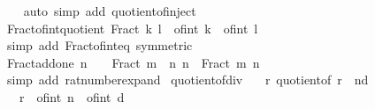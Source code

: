 \begin{isabellebody}
%
\isadelimproof
\ \ %
\endisadelimproof
%
\isatagproof
{}\isamarkupfalse%
\ {\isacharparenleft}{\kern0pt}auto\ simp\ add{\isacharcolon}{\kern0pt}\ quotient{\isacharunderscore}{\kern0pt}of{\isacharunderscore}{\kern0pt}inject{\isacharparenright}{\kern0pt}%
\endisatagproof
{\isafoldproof}%
%
\isadelimproof
%
\endisadelimproof
%
\isadelimdocument
%
\endisadelimdocument
%
\isatagdocument
%
\isamarkuptrue%
%
\endisatagdocument
{\isafolddocument}%
%
\isadelimdocument
%
\endisadelimdocument
{}\isamarkupfalse%
\ Fract{\isacharunderscore}{\kern0pt}of{\isacharunderscore}{\kern0pt}int{\isacharunderscore}{\kern0pt}quotient{\isacharcolon}{\kern0pt}\ {\isachardoublequoteopen}Fract\ k\ l\ {\isacharequal}{\kern0pt}\ of{\isacharunderscore}{\kern0pt}int\ k\ {\isacharslash}{\kern0pt}\ of{\isacharunderscore}{\kern0pt}int\ l{\isachardoublequoteclose}\isanewline
%
\isadelimproof
\ \ %
\endisadelimproof
%
\isatagproof
{}\isamarkupfalse%
\ {\isacharparenleft}{\kern0pt}simp\ add{\isacharcolon}{\kern0pt}\ Fract{\isacharunderscore}{\kern0pt}of{\isacharunderscore}{\kern0pt}int{\isacharunderscore}{\kern0pt}eq\ {\isacharbrackleft}{\kern0pt}symmetric{\isacharbrackright}{\kern0pt}{\isacharparenright}{\kern0pt}%
\endisatagproof
{\isafoldproof}%
%
\isadelimproof
\isanewline
%
\endisadelimproof
\isanewline
{}\isamarkupfalse%
\ Fract{\isacharunderscore}{\kern0pt}add{\isacharunderscore}{\kern0pt}one{\isacharcolon}{\kern0pt}\ {\isachardoublequoteopen}n\ {\isasymnoteq}\ {}\ {\isasymLongrightarrow}\ Fract\ {\isacharparenleft}{\kern0pt}m\ {\isacharplus}{\kern0pt}\ n{\isacharparenright}{\kern0pt}\ n\ {\isacharequal}{\kern0pt}\ Fract\ m\ n\ {\isacharplus}{\kern0pt}\ {}{\isachardoublequoteclose}\isanewline
%
\isadelimproof
\ \ %
\endisadelimproof
%
\isatagproof
{}\isamarkupfalse%
\ {\isacharparenleft}{\kern0pt}simp\ add{\isacharcolon}{\kern0pt}\ rat{\isacharunderscore}{\kern0pt}number{\isacharunderscore}{\kern0pt}expand{\isacharparenright}{\kern0pt}%
\endisatagproof
{\isafoldproof}%
%
\isadelimproof
\isanewline
%
\endisadelimproof
\isanewline
{}\isamarkupfalse%
\ quotient{\isacharunderscore}{\kern0pt}of{\isacharunderscore}{\kern0pt}div{\isacharcolon}{\kern0pt}\isanewline
\ \ \ r{\isacharcolon}{\kern0pt}\ {\isachardoublequoteopen}quotient{\isacharunderscore}{\kern0pt}of\ r\ {\isacharequal}{\kern0pt}\ {\isacharparenleft}{\kern0pt}n{\isacharcomma}{\kern0pt}d{\isacharparenright}{\kern0pt}{\isachardoublequoteclose}\isanewline
\ \ \ {\isachardoublequoteopen}r\ {\isacharequal}{\kern0pt}\ of{\isacharunderscore}{\kern0pt}int\ n\ {\isacharslash}{\kern0pt}\ of{\isacharunderscore}{\kern0pt}int\ d{\isachardoublequoteclose}\isanewline

\end{isabellebody}
